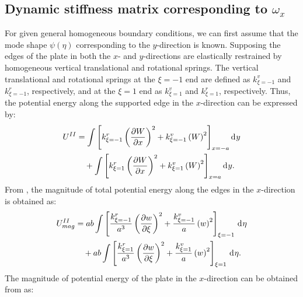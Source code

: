 \documentclass[preprint,12pt]{elsarticle}
\newcommand{\id}{\mathrm{d}\mkern1mu}
\begin{document}
\subsection{Dynamic stiffness matrix corresponding to $\omega_x$}\label{sec:DSMx}
For given general homogeneous boundary conditions, we can first assume that the mode shape $\psi(\eta)$ corresponding to the $y$-direction is known. 
Supposing the edges of the plate in both the \(x\)- and \(y\)-directions are elastically restrained by homogeneous vertical translational and rotational springs.
The vertical translational and rotational springs at the \(\xi = -1\) end are defined as \(k^v_{\xi = -1}\) and \(k^r_{\xi = -1}\), respectively, and at the \(\xi = 1\) end as \(k^v_{\xi = 1}\) and \(k^r_{\xi = 1}\), respectively. 
Thus, the potential energy along the supported edge in the \(x\)-direction can be expressed by:
%
\begin{equation}\label{eq:poten_energy_edgex}
	\begin{split}
		U^{II} &=  \int\left[k^r_{\xi=-1} \left( \frac{\partial W}{\partial x} \right)^2 + k^v_{\xi=-1} \left( W \right)^2\right]_{x=-a} \id y\\
		&\quad +  \int\left[k^r_{\xi=1} \left( \frac{\partial W}{\partial x} \right)^2 + k^v_{\xi=1} \left( W \right)^2\right]_{x=a} \id y.
	\end{split}
\end{equation}
%
From , the magnitude of total potential energy along the edges in the \(x\)-direction is obtained as:
%
\begin{equation}\label{eq:poten_energy_edgex2}
	\begin{split}
		U^{II}_{mag} &= ab \int\left[\frac{k^r_{\xi=-1}}{a^3} \left( \frac{\partial w}{\partial \xi} \right)^2 + \frac{k^v_{\xi=-1}}{a} \left( w \right)^2\right]_{\xi=-1} \, \id \eta \\
		&\quad + ab \int\left[\frac{k^r_{\xi=1}}{a^3} \left( \frac{\partial w}{\partial \xi} \right)^2 + \frac{k^v_{\xi=1}}{a} \left( w \right)^2\right]_{\xi=1} \, \id \eta.
	\end{split}
\end{equation}
%
The magnitude of potential energy of the plate in the \(x\)-direction can be obtained from  as:
%
\end{document}
